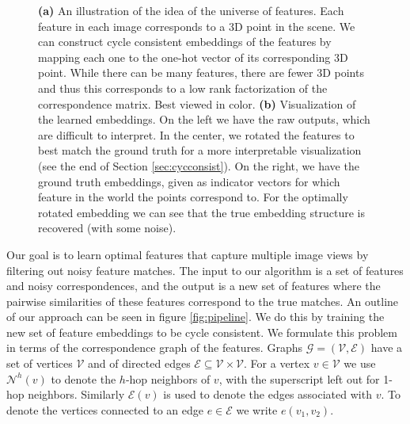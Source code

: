 \documentclass{article} %
\begin{document}
\begin{figure}[t]
\begin{subfigure}[b]{.55\linewidth}
  \label{fig:embeddingsviz}
\end{subfigure}
\caption{
  \textbf{(a)} An illustration of the idea of the universe of features.
  Each feature in each image corresponds to a 3D point in the scene.
  We can construct cycle consistent embeddings of the features by mapping each one to the one-hot vector of its corresponding 3D point.
  While there can be many features, there are fewer 3D points and thus this corresponds to a low rank factorization of the correspondence matrix.
  Best viewed in color.
  \textbf{(b)} Visualization of the learned embeddings.
  On the left we have the raw outputs, which are difficult to interpret.
  In the center, we rotated the features to best match the ground truth for a more interpretable visualization (see the end of Section \ref{sec:cycconsist}).
  On the right, we have the ground truth embeddings, given as indicator vectors for which feature in the world the points correspond to.
  For the optimally rotated embedding we can see that the true embedding structure is recovered (with some noise).
}
\label{fig:1}
\end{figure}

Our goal is to learn optimal features that capture multiple image views by filtering out noisy feature matches.
The input to our algorithm is a set of features and noisy correspondences, and the output is a new set of features where the pairwise similarities of these features correspond to the true matches.
An outline of our approach can be seen in figure \ref{fig:pipeline}.
We do this by training the new set of feature embeddings to be cycle consistent.
We formulate this problem in terms of the correspondence graph of the features.
Graphs $\mathcal{G} = (\mathcal{V}, \mathcal{E})$ have a set of vertices $\mathcal{V}$ and of directed edges $\mathcal{E} \subseteq \mathcal{V} \times \mathcal{V}$.
For a vertex $v \in \mathcal{V}$ we use $\mathcal{N}^{h}(v)$ to denote the $h$-hop neighbors of $v$, with the superscript left out for 1-hop neighbors.
Similarly $\mathcal{E}(v)$ is used to denote the edges associated with $v$.
To denote the vertices connected to an edge $e \in \mathcal{E}$ we write $e(v_1, v_2)$.
\end{document}
